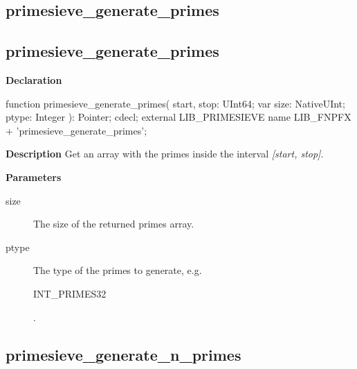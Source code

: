 \documentclass{report}
\newif\ifpdf
\begin{document}
\subsection*{\large{\textbf{primesieve{\_}generate{\_}primes}}\normalsize\hspace{1ex}\hrulefill}
\else
\subsection*{primesieve{\_}generate{\_}primes}
\fi
\label{primesieve-primesieve_generate_primes}
\begin{list}{}{
\setlength{\itemindent}{0cm}
\setlength{\listparindent}{0cm}
\setlength{\leftmargin}{\evensidemargin}
\addtolength{\leftmargin}{\tmplength}
\settowidth{\labelsep}{X}
\addtolength{\leftmargin}{\labelsep}
\setlength{\labelwidth}{\tmplength}
}
\item[\textbf{Declaration}\hfill]
\ifpdf
\begin{flushleft}
\fi
\begin{ttfamily}
function primesieve{\_}generate{\_}primes( start, stop: UInt64; var size: NativeUInt; ptype: Integer ): Pointer; cdecl; external LIB{\_}PRIMESIEVE name LIB{\_}FNPFX + 'primesieve{\_}generate{\_}primes';\end{ttfamily}

\ifpdf
\end{flushleft}
\fi

\par
\item[\textbf{Description}]
Get an array with the primes inside the interval \textit{[start, stop]}.

 \par
\item[\textbf{Parameters}]
\begin{description}
\item[size] The size of the returned primes array.
\item[ptype] The type of the primes to generate, e.g. \begin{ttfamily}INT{\_}PRIMES32\end{ttfamily}.
\end{description}


\end{list}
\ifpdf
\subsection*{\large{\textbf{primesieve{\_}generate{\_}n{\_}primes}}\normalsize\hspace{1ex}\hrulefill}
\else
\end{document}
